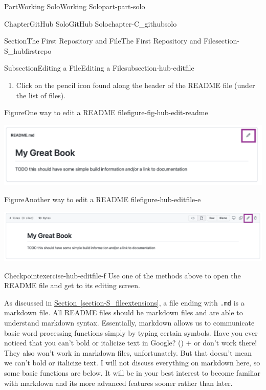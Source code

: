 \documentclass[oneside,10pt,]{book}
\newcommand{\xreffont}{\relax}
\newcommand{\mono}[1]{\texttt{#1}}
\newcommand{\kbd}[1]{\keys{{#1}}}
\begin{document}
\begin{partptx}{Part}{Working Solo}{}{Working Solo}{}{}{part-part-solo}
\begin{chapterptx}{Chapter}{GitHub Solo}{}{GitHub Solo}{}{}{chapter-C_githubsolo}
\begin{sectionptx}{Section}{The First Repository and File}{}{The First Repository and File}{}{}{section-S_hubfirstrepo}
\begin{subsectionptx}{Subsection}{Editing a File}{}{Editing a File}{}{}{subsection-hub-editfile}
\begin{enumerate}
\item{}Click on the pencil icon found along the header of the README file (under the list of files).%
\end{enumerate}
%
\begin{figureptx}{Figure}{One way to edit a README file}{figure-fig-hub-edit-readme}{}%
\begin{image}{0.05}{0.9}{0.05}{}%
\includegraphics[width=\linewidth]{external/hub_edit_readme_code.pdf}
\end{image}%
\tcblower
\end{figureptx}%
\begin{figureptx}{Figure}{Another way to edit a README file}{figure-hub-editfile-e}{}%
\begin{image}{0.05}{0.9}{0.05}{}%
\includegraphics[width=\linewidth]{external/hub_edit_readme_file.pdf}
\end{image}%
\tcblower
\end{figureptx}%
\begin{inlineexercise}{Checkpoint}{}{exercise-hub-editfile-f}%
Use one of the methods above to open the README file and get to its editing screen.%
\end{inlineexercise}%
As discussed in \hyperref[section-S_fileextensions]{Section~{\xreffont\ref{section-S_fileextensions}}}, a file ending with \mono{.md} is a markdown file. All README files should be markdown files and are able to understand markdown syntax. Essentially, markdown allows us to communicate basic word processing functions simply by typing certain symbols. Have you ever noticed that you can't bold or italicize text in Google? \kbd{Control} (\kbd{Command}) + \kbd{B} or \kbd{I} don't work there! They also won't work in markdown files, unfortunately. But that doesn't mean we can't bold or italicize text. I will not discuss everything on markdown here, so some basic functions are below. It will be in your best interest to become familiar with markdown and its more advanced features sooner rather than later.%

\end{subsectionptx}
\end{sectionptx}
\end{chapterptx}
\end{partptx}
\end{document}
